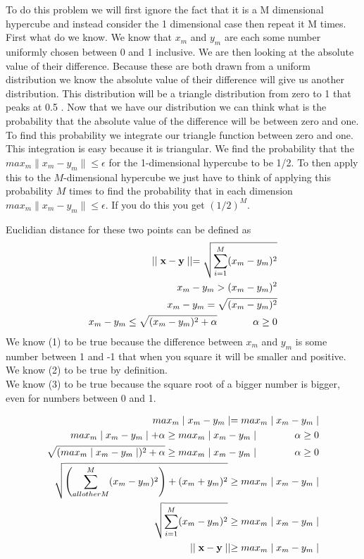 \documentclass[solution, letterpaper]{cs121}
\begin{document}

\subproblem %
To do this problem we will first ignore the fact that it is a M dimensional hypercube and instead consider the 1 dimensional case then repeat it M times. First what do we know. We know that $x_m$ and $y_m$ are each some number uniformly chosen between 0 and 1 inclusive. We are then looking at the absolute value of their difference. Because these are both drawn from a uniform distribution we know the absolute value of their difference will give us another distribution. This distribution will be a triangle distribution from zero to 1 that peaks at 0.5 . Now that we have our distribution we can think what is the probability that the absolute value of the difference will be between zero and one. To find this probability we integrate our triangle function between zero and one. This integration is easy because it is triangular. We find the probability that the $max_m \| x_m-y_m \| \leq \epsilon $ for the 1-dimensional hypercube to be 1/2. To then apply this to the $M$-dimensional hypercube we just have to think of applying this probability $M$ times to find the probability that in each dimension $max_m \| x_m-y_m \| \leq \epsilon $. If you do this you get $(1/2)^M$.

\subproblem %

\subproblem %
Euclidian distance for these two points can be defined as 
\begin{eqnarray}
 \mathrel|\mathrel| {\bf x - y} \mathrel|\mathrel| = \sqrt{\sum\limits_{i=1}^M (x_m - y_m)^2}  \nonumber   \\
x_m - y_m > (x_m - y_m)^2  \\
x_m - y_m = \sqrt{(x_m - y_m)^2}  \\
x_m - y_m \leq \sqrt{(x_m - y_m)^2 + \alpha} \hspace*{0.5in}  \alpha \geq 0 
\end{eqnarray}
We know (1) to be true because the difference between $x_m$ and $y_m$ is some number between 1 and -1 that when you square it will be smaller and positive.\\
We know (2) to be true by definition.\\
We know (3) to be true because the square root of a bigger number is bigger, even for numbers between 0 and 1. 

\begin{eqnarray}
max_m \mathrel| x_m-y_m \mathrel| =  max_m \mathrel| x_m-y_m \mathrel| \\
max_m \mathrel| x_m-y_m \mathrel| + \alpha \geq  max_m \mathrel| x_m-y_m \mathrel|  \hspace*{0.5in} \alpha \geq 0\\
\sqrt{(max_m \mathrel| x_m-y_m \mathrel|)^2 + \alpha} \geq max_m \mathrel| x_m-y_m \mathrel| \hspace*{0.5in}  \alpha \geq 0\\
\sqrt{\left(\sum\limits_{all other M}^M (x_m - y_m)^2 \right) + (x_m + y_m)^2}  \geq  max_m \mathrel| x_m-y_m \mathrel| \\
\sqrt{\sum\limits_{i=1}^M (x_m - y_m)^2}  \geq  max_m \mathrel| x_m-y_m \mathrel| \\
\mathrel|\mathrel| {\bf x - y} \mathrel|\mathrel|  \geq  max_m \mathrel| x_m-y_m \mathrel| 
\end{eqnarray}
\end{document}
